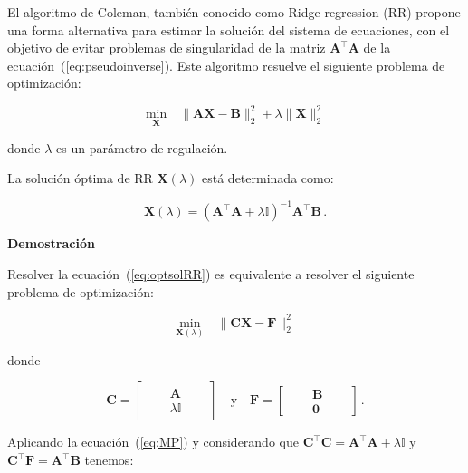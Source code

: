El algoritmo de Coleman, también conocido como Ridge regression (RR) propone
una forma alternativa para estimar la solución del sistema de ecuaciones, con
el objetivo de evitar problemas de singularidad de la matriz 
$\mathbf{A}^\top \mathbf{A}$ 
de la ecuación~(\ref{eq:pseudoinverse}).  Este algoritmo resuelve
el siguiente problema de optimización:

\begin{equation}
\label{eq:RRproblem}
\underset{\mathbf{X}}{\text{min}} \quad \|
\mathbf{A}\mathbf{\mathbf{X}} - \mathbf{B} \|_2^2 +\lambda \|
\mathbf{\mathbf{X}}\|_2^2 
\end{equation}

\noindent donde $\lambda$ es un parámetro de regulación.

La solución óptima de RR $\mathbf{X}(\lambda)$ está determinada como:

\begin{equation}
\label{eq:optsolRR}
\mathbf{X}(\lambda)=(\mathbf{A}^\top \mathbf{A}+ \lambda
\mathbb{I})^{-1}\mathbf{A}^\top \mathbf{B} \, . 
\end{equation}


\textbf{Demostración}\quad

Resolver la ecuación~(\ref{eq:optsolRR}) es equivalente a resolver
el siguiente problema de optimización:


\begin{equation}
\label{eq:RRproblem2}
\underset{\mathbf{X}(\lambda)}{\text{min}} \quad \|
\mathbf{C}\mathbf{\mathbf{X}} - \mathbf{F} \|_2^2
\end{equation}

\noindent donde

\begin{equation*}
    \mathbf{C}=\begin{bmatrix} \quad &\mathbf{A}& \quad \\ %
& \lambda\mathbb{I}&\quad  \end{bmatrix} \quad \text{y} \quad
    \mathbf{F}=\begin{bmatrix} \quad &\mathbf{B}& \quad \\ %
& \mathbf{0}&\quad  \end{bmatrix} \, .
\end{equation*}

Aplicando la ecuación~(\ref{eq:MP}) y considerando que $\mathbf{C}^\top
\mathbf{C} = \mathbf{A}^\top \mathbf{A} + \lambda \mathbb{I}$ y
$\mathbf{C}^\top \mathbf{F}=\mathbf{A}^\top \mathbf{B} $ tenemos:

